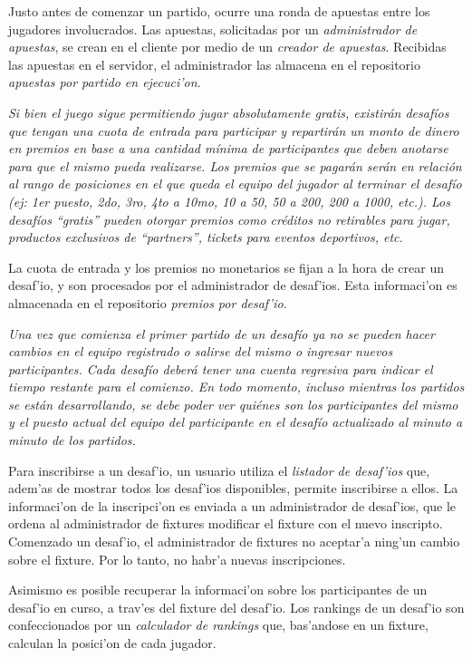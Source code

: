 Justo antes de comenzar un partido, ocurre una ronda de apuestas entre los jugadores involucrados. Las apuestas, solicitadas por un \textit{administrador de apuestas}, se crean en el cliente por medio de un \textit{creador de apuestas}. Recibidas las apuestas en el servidor, el administrador las almacena en el repositorio \textit{apuestas por partido en ejecuci'on}.

\textit{
Si bien el juego sigue permitiendo jugar absolutamente gratis, existirán desafíos que tengan una cuota de entrada para participar y repartirán un monto de dinero en premios en base a una cantidad mínima de participantes que deben anotarse para que el mismo pueda realizarse. Los premios que se pagarán serán en relación al rango de posiciones en el que queda el equipo del jugador al terminar el desafío (ej: 1er puesto, 2do, 3ro, 4to a 10mo, 10 a 50, 50 a 200, 200 a 1000, etc.).
Los desafíos “gratis” pueden otorgar premios como créditos no retirables para jugar, productos exclusivos de “partners”, tickets para eventos deportivos, etc.
}

La cuota de entrada y los premios no monetarios se fijan a la hora de crear un desaf'io, y son procesados por el administrador de desaf'ios. Esta informaci'on es almacenada en el repositorio \textit{premios por desaf'io}.

\textit{Una vez que comienza el primer partido de un desafío ya no se pueden hacer cambios en el equipo registrado o salirse del mismo o ingresar nuevos participantes. Cada desafío deberá tener una cuenta regresiva para indicar el tiempo restante para el comienzo. En todo momento, incluso mientras los partidos se están desarrollando, se debe poder ver quiénes son los participantes del mismo y el puesto actual del equipo del participante en el desafío actualizado al minuto a minuto de los partidos.}

Para inscribirse a un desaf'io, un usuario utiliza el \textit{listador de desaf'ios} que, adem'as de mostrar todos los desaf'ios disponibles, permite inscribirse a ellos. La informaci'on de la inscripci'on es enviada a un administrador de desaf'ios, que le ordena al administrador de fixtures modificar el fixture con el nuevo inscripto. Comenzado un desaf'io, el administrador de fixtures no aceptar'a ning'un cambio sobre el fixture. Por lo tanto, no habr'a nuevas inscripciones.

Asimismo es posible recuperar la informaci'on sobre los participantes de un desaf'io en curso, a trav'es del fixture del desaf'io. Los rankings de un desaf'io son confeccionados por un \textit{calculador de rankings} que, bas'andose en un fixture, calculan la posici'on de cada jugador.

